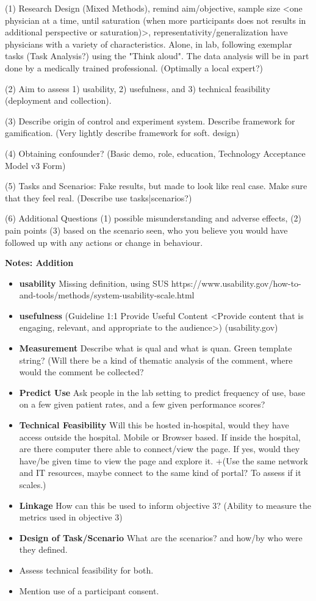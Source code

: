 (1) Research Design (Mixed Methods), remind aim/objective, sample size <one physician at a time, until saturation (when more participants does not results in additional perspective or saturation)>, representativity/generalization have physicians with a variety of characteristics. Alone, in lab, following exemplar tasks (Task Analysis?) using the "Think aloud". The data analysis will be in part done by a medically trained professional. (Optimally a local expert?)

(2) Aim to assess 1) usability, 2) usefulness, and 3) technical feasibility (deployment and collection).

(3) Describe origin of control and experiment system. Describe framework for gamification. (Very lightly describe framework for soft. design)

(4) Obtaining confounder? (Basic demo, role, education, Technology Acceptance Model v3 Form)

(5) Tasks and Scenarios: Fake results, but made to look like real case. Make sure that they feel real. (Describe use tasks|scenarios?)

(6) Additional Questions (1) possible misunderstanding and adverse effects, (2) pain points (3) based on the scenario seen, who you believe you would have followed up with any actions or change in behaviour.

\textbf{Notes: Addition}
\begin{itemize}
    \item \textbf{usability} Missing definition, using SUS https://www.usability.gov/how-to-and-tools/methods/system-usability-scale.html
    \item \textbf{usefulness} (Guideline 1:1 Provide Useful Content <Provide content that is engaging, relevant, and appropriate to the audience>) (usability.gov)
    \item \textbf{Measurement} Describe what is qual and what is quan. Green template string? (Will there be a kind of thematic analysis of the comment, where would the comment be collected?
    \item \textbf{Predict Use} Ask people in the lab setting to predict frequency of use, base on a few given patient rates, and a few given performance scores?
    \item \textbf{Technical Feasibility} Will this be hosted in-hospital, would they have access outside the hospital. Mobile or Browser based. If inside the hospital, are there computer there able to connect/view the page. If yes, would they have/be given time to view the page and explore it. +(Use the same network and IT resources, maybe connect to the same kind of portal? To assess if it scales.)
    \item \textbf{Linkage} How can this be used to inform objective 3? (Ability to measure the metrics used in objective 3)
    \item \textbf{Design of Task/Scenario} What are the scenarios? and how/by who were they defined.
    \item Assess technical feasibility for both.
    \item Mention use of a participant consent.
\end{itemize}

